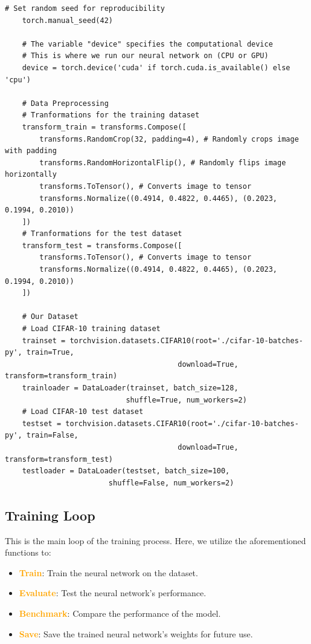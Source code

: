 \begin{lstlisting}[caption={Data Preparation}, label={lst:data_prep}]
    # Set random seed for reproducibility
    torch.manual_seed(42)

    # The variable "device" specifies the computational device 
    # This is where we run our neural network on (CPU or GPU)
    device = torch.device('cuda' if torch.cuda.is_available() else 'cpu')

    # Data Preprocessing 
    # Tranformations for the training dataset
    transform_train = transforms.Compose([
        transforms.RandomCrop(32, padding=4), # Randomly crops image with padding
        transforms.RandomHorizontalFlip(), # Randomly flips image horizontally
        transforms.ToTensor(), # Converts image to tensor
        transforms.Normalize((0.4914, 0.4822, 0.4465), (0.2023, 0.1994, 0.2010))
    ])
    # Tranformations for the test dataset
    transform_test = transforms.Compose([
        transforms.ToTensor(), # Converts image to tensor
        transforms.Normalize((0.4914, 0.4822, 0.4465), (0.2023, 0.1994, 0.2010))
    ])

    # Our Dataset
    # Load CIFAR-10 training dataset
    trainset = torchvision.datasets.CIFAR10(root='./cifar-10-batches-py', train=True,
                                        download=True, transform=transform_train)
    trainloader = DataLoader(trainset, batch_size=128,
                            shuffle=True, num_workers=2)
    # Load CIFAR-10 test dataset
    testset = torchvision.datasets.CIFAR10(root='./cifar-10-batches-py', train=False,
                                        download=True, transform=transform_test)
    testloader = DataLoader(testset, batch_size=100,
                        shuffle=False, num_workers=2)
\end{lstlisting}

\subsection{Training Loop}
This is the main loop of the training process. Here, we utilize the aforementioned functions to:
\begin{itemize}[noitemsep]
    \item \textcolor{orange}{\textbf{Train}}: Train the neural network on the dataset.
    \item \textcolor{orange}{\textbf{Evaluate}}: Test the neural network's performance.
    \item \textcolor{orange}{\textbf{Benchmark}}: Compare the performance of the model.
    \item \textcolor{orange}{\textbf{Save}}: Save the trained neural network's weights for future use.
\end{itemize}

